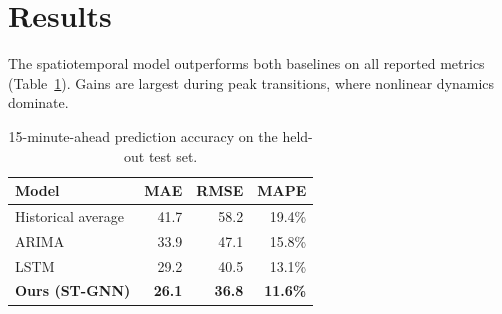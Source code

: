 \section{Results}
The spatiotemporal model outperforms both baselines on all reported metrics
(Table~\ref{tab:res}). Gains are largest during peak transitions, where nonlinear dynamics
dominate.

\begin{table}[ht]\centering
\caption{15-minute-ahead prediction accuracy on the held-out test set.}
\label{tab:res}
\begin{tabularx}{\linewidth}{@{}X r r r@{}}
\toprule
\textbf{Model} & \textbf{MAE} & \textbf{RMSE} & \textbf{MAPE}\\
\midrule
Historical average & 41.7 & 58.2 & 19.4\%\\
ARIMA              & 33.9 & 47.1 & 15.8\%\\
LSTM               & 29.2 & 40.5 & 13.1\%\\
\textbf{Ours (ST-GNN)} & \textbf{26.1} & \textbf{36.8} & \textbf{11.6\%}\\
\bottomrule
\end{tabularx}
\end{table}
